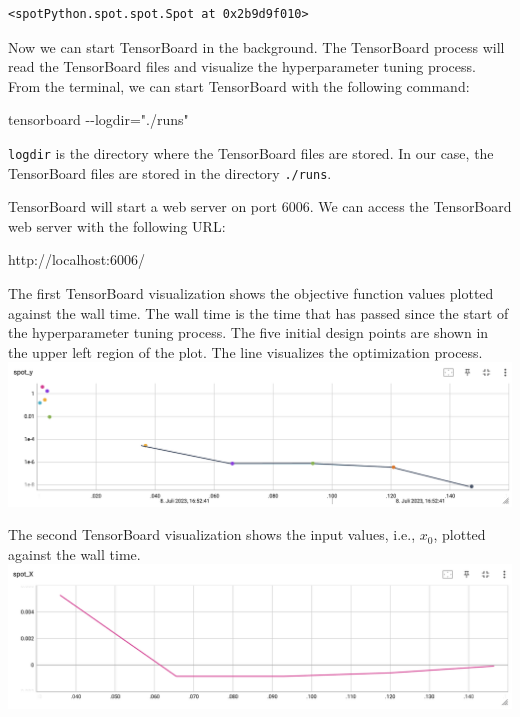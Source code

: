 \documentclass[
  letterpaper,
  DIV=11,
  numbers=noendperiod]{scrreprt}
\newenvironment{Shaded}{\begin{snugshade}}{\end{snugshade}}
\newcommand{\NormalTok}[1]{\textcolor[rgb]{0.00,0.23,0.31}{#1}}
\begin{document}
\begin{verbatim}
<spotPython.spot.spot.Spot at 0x2b9d9f010>
\end{verbatim}

Now we can start TensorBoard in the background. The TensorBoard process
will read the TensorBoard files and visualize the hyperparameter tuning
process. From the terminal, we can start TensorBoard with the following
command:

\begin{Shaded}
\begin{Highlighting}[]
\NormalTok{tensorboard {-}{-}logdir="./runs"}
\end{Highlighting}
\end{Shaded}

\texttt{logdir} is the directory where the TensorBoard files are stored.
In our case, the TensorBoard files are stored in the directory
\texttt{./runs}.

TensorBoard will start a web server on port 6006. We can access the
TensorBoard web server with the following URL:

\begin{Shaded}
\begin{Highlighting}[]
\NormalTok{http://localhost:6006/}
\end{Highlighting}
\end{Shaded}

The first TensorBoard visualization shows the objective function values
plotted against the wall time. The wall time is the time that has passed
since the start of the hyperparameter tuning process. The five initial
design points are shown in the upper left region of the plot. The line
visualizes the optimization process.
\includegraphics{figures_static/01_tensorboard_01.png}

The second TensorBoard visualization shows the input values, i.e.,
\(x_0\), plotted against the wall time.
\includegraphics{figures_static/01_tensorboard_02.png}
\end{document}
